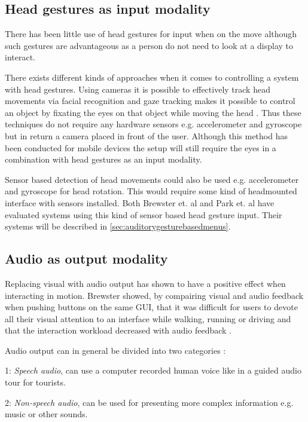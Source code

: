 \subsection{Head gestures as input modality}

There has been little use of head gestures for input when on the move \cite{brewster_multimodaleyes-freeinteraction_2003} although such gestures are advantageous as a person do not need to look at a display to interact.

There exists different kinds of approaches when it comes to controlling a system with head gestures. Using cameras it is possible to effectively track head movements via facial recognition \cite{morimoto_recognition_1996} and gaze tracking makes it possible to control an object by fixating the eyes on that object while moving the head \cite{vspakov_enhanced_2012}. Thus these techniques do not require any hardware sensors e.g. accelerometer and gyroscope but in return a camera placed in front of the user. Although this method has been conducted for mobile devices \cite{mardanbegi_eye-based_2012} the setup will still require the eyes in a combination with head gestures as an input modality.

Sensor based detection of head movements could also be used e.g. accelerometer and gyroscope for head rotation. This would require some kind of headmounted interface with sensors installed. Both Brewster et. al \cite{brewster_multimodaleyes-freeinteraction_2003} and Park et. al \cite{park_gaze-directed_2011} have evaluated systems using this kind of sensor based head gesture input. Their systems will be described in \ref{sec:auditorygesturebasedmenus}.

\subsection{Audio as output modality}
\label{sec:audiomodality}
Replacing visual with audio output has shown to have a positive effect when interacting in motion. Brewster showed, by compairing visual and audio feedback when pushing buttons on the same GUI, that it was difficult for users to devote all their visual attention to an interface while walking, running or driving and that the interaction workload decreased with audio feedback \cite{brewster_overcoming_2002}.

Audio output can in general be divided into two categories \cite{rocchesso_sounding_2003}:
\begin{description}
\item{1: \textit{Speech audio}}, can use a computer recorded human voice like in a guided audio tour for tourists.
\item{2: \textit{Non-speech audio}}, can be used for presenting more complex information e.g. music or other sounds.
\end{description}

